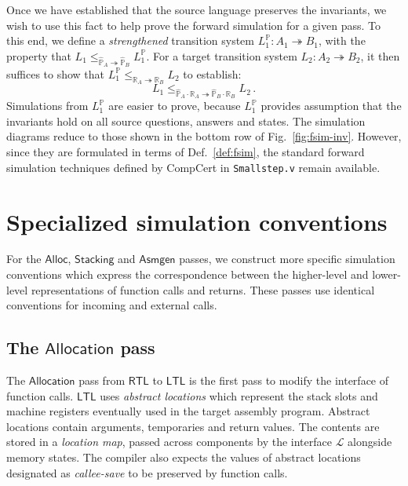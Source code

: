 \documentclass[11pt,oneside,draft]{book}
\theoremstyle{definition}
\newcommand{\kw}[1]{\ensuremath{ \mathsf{#1} }}
\begin{document}
Once we have established that
the source language preserves the invariants,
we wish to use this fact to help prove the forward simulation
for a given pass.
To this end,
we define a \emph{strengthened} transition system
$L_1^\mathbb{P} : A_1 \twoheadrightarrow B_1$,
with the property that
$
   L_1 \le_{\hat{\mathbb{P}}_A \twoheadrightarrow \hat{\mathbb{P}}_B}
   L_1^\mathbb{P}
$.
For a target transition system $L_2 : A_2 \twoheadrightarrow B_2$,
it then suffices to show that
$
  L_1^\mathbb{P}
  \le_{\mathbb{R}_A \twoheadrightarrow \mathbb{R}_B}
  L_2
$
to establish:
\[
  L_1
  \le_{\hat{\mathbb{P}}_A \cdot \mathbb{R}_A \twoheadrightarrow
       \hat{\mathbb{P}}_B \cdot \mathbb{R}_B}
  L_2 \,.
\]
Simulations from $L_1^\mathbb{P}$
are easier to prove,
because $L_1^\mathbb{P}$
provides assumption that the invariants hold
on all source questions, answers and states.
The simulation diagrams
reduce to those shown in the bottom row of
Fig.~\ref{fig:fsim-inv}.
However, since they are formulated in terms of
Def.~\ref{def:fsim},
the standard forward simulation techniques
defined by CompCert
in \texttt{Smallstep.v}
remain available.



\section{Specialized simulation conventions} \label{sec:backend} %

For the \kw{Alloc}, \kw{Stacking} and \kw{Asmgen} passes,
we construct more specific simulation conventions
which express the correspondence between
the higher-level and lower-level representations
of function calls and returns.
These passes use identical conventions for
incoming and external calls.

\subsection{The \kw{Allocation} pass} \label{sec:alloc} %

The \kw{Allocation} pass from \kw{RTL} to \kw{LTL}
is the first pass to modify the interface of function calls.
\kw{LTL} uses \emph{abstract locations}
which represent the stack slots and machine registers
eventually used in the target assembly program.
Abstract locations contain arguments, temporaries and return values.
The contents are stored in a \emph{location map},
passed across components by the interface $\mathcal{L}$
alongside memory states.
The compiler also expects the values of
abstract locations designated as \emph{callee-save}
to be preserved by function calls.
\end{document}
